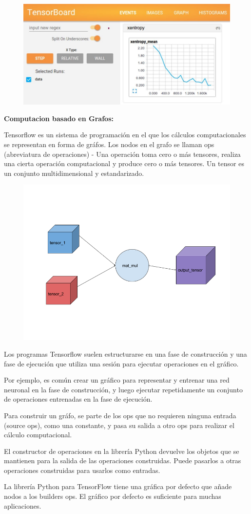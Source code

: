 \begin{figure}[ht]
	\centering
	\includegraphics[width=0.30\linewidth]{figuras/tensorboard.jpg}
	\label{qvalue}
\end{figure}


\textbf{Computacion basado en Grafos:}

Tensorflow es un sistema de programación en el que los cálculos computacionales se representan en forma de gráfos. Los nodos en el grafo se llaman ops (abreviatura de operaciones) - Una operación toma cero o más tensores, realiza una cierta operación computacional y produce cero o más tensores. Un tensor es un conjunto multidimensional y estandarizado.


\begin{figure}[ht]
	\centering
	\includegraphics[width=0.30\linewidth]{figuras/tf1.png}
	\label{qvalue}
\end{figure}

Los programas Tensorflow suelen estructurarse en una fase de construcción y una fase de ejecución que utiliza una sesión para ejecutar operaciones en el gráfico.

Por ejemplo, es común crear un gráfico para representar y entrenar una red neuronal en la fase de construcción, y luego ejecutar repetidamente un conjunto de operaciones entrenadas en la fase de ejecución.

Para construir un gráfo, se parte de los ops que no requieren ninguna entrada (source ops), como una constante, y pasa su salida a otro ops para realizar el cálculo computacional.

El constructor de operaciones en la librería Python devuelve los objetos que se mantienen para la salida de las operaciones construidas. Puede pasarlos a otras operaciones construidas para usarlos como entradas.

La librería Python para TensorFlow tiene una gráfica por defecto que añade nodos a los builders ops. El gráfico por defecto es suficiente para muchas aplicaciones.

